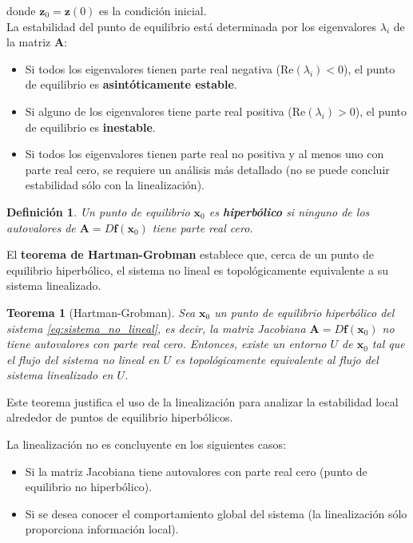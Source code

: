 \documentclass[12pt, a4paper]{report}
\newtheorem{definition}{Definición}
\newtheorem{theorem}{Teorema}
\begin{document}
donde \( \mathbf{z}_0 = \mathbf{z}(0) \) es la condición inicial.\\

La estabilidad del punto de equilibrio está determinada por los eigenvalores \( \lambda_i \) de la matriz \( \mathbf{A} \):

\begin{itemize}
    \item Si todos los eigenvalores tienen parte real negativa (\( \text{Re}(\lambda_i) < 0 \)), el punto de equilibrio es \textbf{asintóticamente estable}.
    \item Si alguno de los eigenvalores tiene parte real positiva (\( \text{Re}(\lambda_i) > 0 \)), el punto de equilibrio es \textbf{inestable}.
    \item Si todos los eigenvalores tienen parte real no positiva y al menos uno con parte real cero, se requiere un análisis más detallado (no se puede concluir estabilidad sólo con la linealización).
\end{itemize}

\begin{definition}
	Un punto de equilibrio \(\mathbf{x}_0\) es \textbf{hiperbólico} si ninguno de los autovalores de \( \mathbf{A} = D\mathbf{f}(\mathbf{x}_0) \) tiene parte real cero.
\end{definition}

El \textbf{teorema de Hartman-Grobman} establece que, cerca de un punto de equilibrio hiperbólico, el sistema no lineal es topológicamente equivalente a su sistema linealizado.

\begin{theorem}[Hartman-Grobman]
	Sea \(\mathbf{x}_0\) un punto de equilibrio hiperbólico del sistema \eqref{eq:sistema_no_lineal}, es decir, la matriz Jacobiana \( \mathbf{A} = D\mathbf{f}(\mathbf{x}_0) \) no tiene autovalores con parte real cero. Entonces, existe un entorno \( U \) de \(\mathbf{x}_0\) tal que el flujo del sistema no lineal en \( U \) es topológicamente equivalente al flujo del sistema linealizado en \( U \).
\end{theorem}

Este teorema justifica el uso de la linealización para analizar la estabilidad local alrededor de puntos de equilibrio hiperbólicos.


La linealización no es concluyente en los siguientes casos:

\begin{itemize}
    \item Si la matriz Jacobiana tiene autovalores con parte real cero (punto de equilibrio no hiperbólico).
    \item Si se desea conocer el comportamiento global del sistema (la linealización sólo proporciona información local).
\end{itemize}
\end{document}
